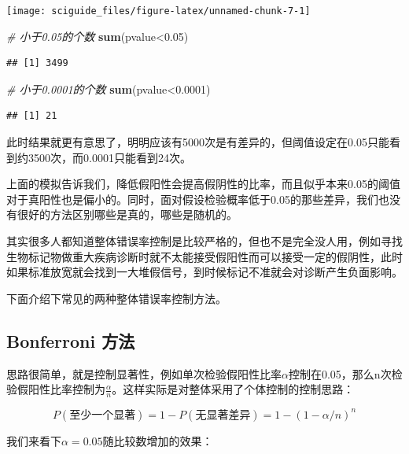 \documentclass[]{tufte-book}
\newenvironment{Shaded}{}{}
\newcommand{\CommentTok}[1]{\textcolor[rgb]{0.38,0.63,0.69}{\textit{#1}}}
\newcommand{\FloatTok}[1]{\textcolor[rgb]{0.25,0.63,0.44}{#1}}
\newcommand{\KeywordTok}[1]{\textcolor[rgb]{0.00,0.44,0.13}{\textbf{#1}}}
\newcommand{\NormalTok}[1]{#1}
\newcommand{\OperatorTok}[1]{\textcolor[rgb]{0.40,0.40,0.40}{#1}}
\begin{document}
\texttt{[image: sciguide\_files/figure-latex/unnamed-chunk-7-1]}

\begin{Shaded}
\begin{Highlighting}[]
\CommentTok{# 小于0.05的个数}
\KeywordTok{sum}\NormalTok{(pvalue}\OperatorTok{<}\FloatTok{0.05}\NormalTok{)}
\end{Highlighting}
\end{Shaded}

\begin{verbatim}
## [1] 3499
\end{verbatim}

\begin{Shaded}
\begin{Highlighting}[]
\CommentTok{# 小于0.0001的个数}
\KeywordTok{sum}\NormalTok{(pvalue}\OperatorTok{<}\FloatTok{0.0001}\NormalTok{)}
\end{Highlighting}
\end{Shaded}

\begin{verbatim}
## [1] 21
\end{verbatim}

此时结果就更有意思了，明明应该有5000次是有差异的，但阈值设定在0.05只能看到约3500次，而0.0001只能看到24次。

上面的模拟告诉我们，降低假阳性会提高假阴性的比率，而且似乎本来0.05的阈值对于真阳性也是偏小的。同时，面对假设检验概率低于0.05的那些差异，我们也没有很好的方法区别哪些是真的，哪些是随机的。

其实很多人都知道整体错误率控制是比较严格的，但也不是完全没人用，例如寻找生物标记物做重大疾病诊断时就不太能接受假阳性而可以接受一定的假阴性，此时如果标准放宽就会找到一大堆假信号，到时候标记不准就会对诊断产生负面影响。

下面介绍下常见的两种整体错误率控制方法。

\hypertarget{bonferroni-ux65b9ux6cd5}{%
\subsection{Bonferroni 方法}\label{bonferroni-ux65b9ux6cd5}}

思路很简单，就是控制显著性，例如单次检验假阳性比率\(\alpha\)控制在0.05，那么n次检验假阳性比率控制为\(\frac{\alpha}{n}\)。这样实际是对整体采用了个体控制的控制思路：

\[
P(至少一个显著)=1-P(无显著差异) = 1-(1-\alpha/n)^n
\]

我们来看下\(\alpha = 0.05\)随比较数增加的效果：
\end{document}

